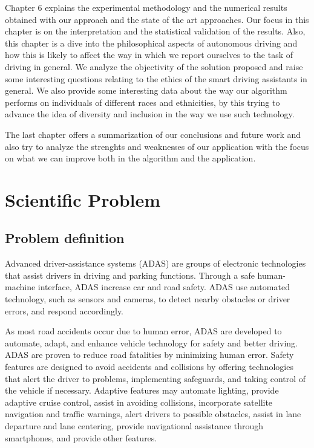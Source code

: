 \documentclass[runningheads,a4paper,11pt]{report}
\begin{document}
Chapter 6 explains the experimental methodology and the numerical results obtained with our approach and the state of the art approaches. Our focus in this chapter is on the interpretation and the statistical validation of the results. Also, this chapter is a dive into the philosophical aspects of autonomous driving and how this is likely to affect the way in which we report ourselves to the task of driving in general. We analyze the objectivity of the solution proposed and raise some interesting questions relating to the ethics of the smart driving assistants in general. We also provide some interesting data about the way our algorithm performs on individuals of different races and ethnicities, by this trying to advance the idea of diversity and inclusion in the way we use such technology.

The last chapter offers a summarization of our conclusions and future work and also try to analyze the strenghts and weaknesses of our application with the focus on what we can improve both in the algorithm and the application.



\chapter{Scientific Problem}
\label{section:scientificProblem}


\section{Problem definition}
\label{section:problemDefinition}

Advanced driver-assistance systems (ADAS) are groups of electronic technologies that assist drivers in driving and parking functions. Through a safe human-machine interface, ADAS increase car and road safety. ADAS use automated technology, such as sensors and cameras, to detect nearby obstacles or driver errors, and respond accordingly.

As most road accidents occur due to human error, ADAS are developed to automate, adapt, and enhance vehicle technology for safety and better driving. ADAS are proven to reduce road fatalities by minimizing human error. Safety features are designed to avoid accidents and collisions by offering technologies that alert the driver to problems, implementing safeguards, and taking control of the vehicle if necessary. Adaptive features may automate lighting, provide adaptive cruise control, assist in avoiding collisions, incorporate satellite navigation and traffic warnings, alert drivers to possible obstacles, assist in lane departure and lane centering, provide navigational assistance through smartphones, and provide other features.
\end{document}
